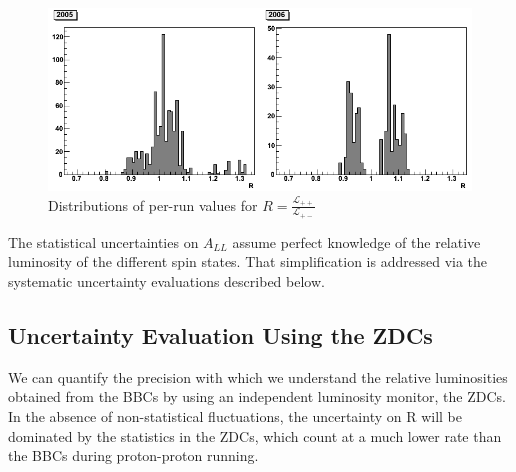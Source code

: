 




\begin{figure}
  \includegraphics[width=1.0\textwidth]{figures/relative_luminosities}
  \caption{Distributions of per-run values for $R = \frac{\mathcal{L}_{++}}{\mathcal{L}_{+-}}$}
\end{figure}

The statistical uncertainties on $A_{LL}$ assume perfect knowledge of the
relative luminosity of the different spin states. That simplification is
addressed via the systematic uncertainty evaluations described below.

\subsection{Uncertainty Evaluation Using the ZDCs}


We can quantify the precision with which we understand the relative luminosities
obtained from the BBCs by using an independent luminosity monitor, the ZDCs. In
the absence of non-statistical fluctuations, the uncertainty on R will be
dominated by the statistics in the ZDCs, which count at a much lower rate than
the BBCs during proton-proton running.

